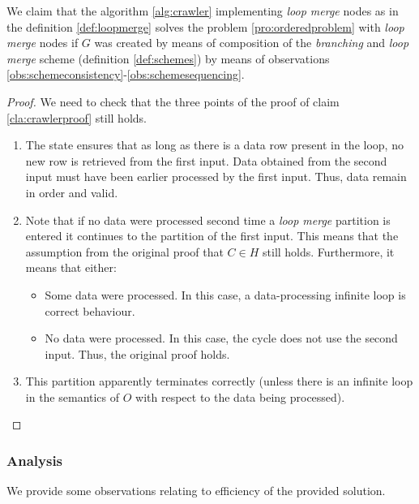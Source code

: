   We claim that the algorithm \ref{alg:crawler} implementing \emph{loop merge} nodes as in the definition \ref{def:loopmerge} solves the problem \ref{pro:orderedproblem} with \emph{loop merge} nodes if $G$ was created by means of composition of the \emph{branching} and \emph{loop merge} scheme (definition \ref{def:schemes}) by means of observations \ref{obs:schemeconsistency}-\ref{obs:schemesequencing}.
  \begin{proof}
    We need to check that the three points of the proof of claim \ref{cla:crawlerproof} still holds.
    \begin{enumerate}
      \item The state ensures that as long as there is a data row present in the loop, no new row is retrieved from the first input. Data obtained from the second input must have been earlier processed by the first input. Thus, data remain in order and valid.
      \item Note that if no data were processed second time a \emph{loop merge} partition is entered it continues to the partition of the first input. This means that the assumption from the original proof that $C \in H$ still holds. Furthermore, it means that either:
       \begin{itemize}
         \item Some data were processed. In this case, a data-processing infinite loop is correct behaviour.
         \item No data were processed. In this case, the cycle does not use the second input. Thus, the original proof holds.
       \end{itemize}
     \item This partition apparently terminates correctly (unless there is an infinite loop in the semantics of $O$ with respect to the data being processed).
    \end{enumerate}
  \end{proof}
\myendclaim


\subsubsection{Analysis}
We provide some observations relating to efficiency of the provided solution.

